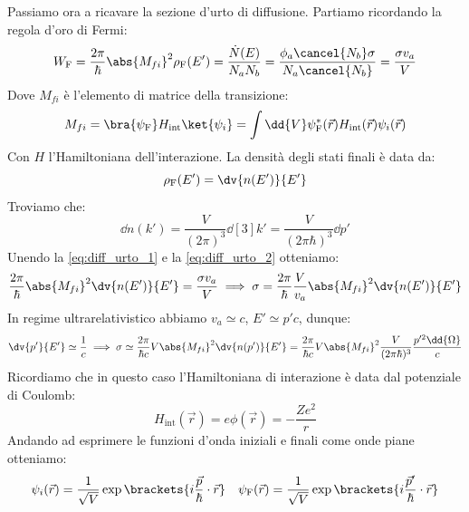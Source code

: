 Passiamo ora a ricavare la sezione d'urto di diffusione. Partiamo ricordando la regola d'oro di Fermi:
\begin{equation} \label{eq:diff_urto_1}
  W_{\text{F}} = \dfrac{2 \pi}{\hbar} \abs{M_{fi}}^2 \rho_{\text{F}}(E') = \dfrac{\dot{N}(E)}{N_a N_b} = \dfrac{\phi_a \cancel{N_b} \sigma}{N_a \cancel{N_b}} = \dfrac{\sigma v_a}{V}
\end{equation}
Dove $M_{fi}$ è l'elemento di matrice della transizione:
\begin{equation}
  M_{fi} = \bra{\psi_{\text{F}}}H_{\text{int}}\ket{\psi_i} = \int \dd{V} \psi_{\text{F}}^*(\vec{r}) H_{\text{int}}(\vec{r}) \psi_i(\vec{r})
\end{equation}
Con $H$ l'Hamiltoniana dell'interazione. La densità degli stati finali è data da:
\begin{equation} \label{eq:diff_urto_2}
  \rho_{\text{F}}(E') = \dv{n(E')}{E'}
\end{equation}
Troviamo che:
\begin{equation}
  \dd{n(k')} = \dfrac{V}{(2 \pi)^3} \dd[3]{k'} = \dfrac{V}{(2 \pi \hbar)^3}\dd{p'}
\end{equation}
Unendo la \eqref{eq:diff_urto_1} e la \eqref{eq:diff_urto_2} otteniamo:
\begin{equation}
  \dfrac{2 \pi}{\hbar} \abs{M_{fi}}^2 \dv{n(E')}{E'} = \dfrac{\sigma v_a}{V} \implies \sigma = \dfrac{2 \pi}{\hbar} \dfrac{V}{v_a} \abs{M_{fi}}^2 \dv{n(E')}{E'}
\end{equation}
In regime ultrarelativistico abbiamo $v_a \simeq c$, $E' \simeq p'c$, dunque:
\begin{equation}
  \dv{p'}{E'} \simeq \dfrac{1}{c} \implies \sigma \simeq \dfrac{2 \pi}{\hbar c} V \abs{M_{fi}}^2 \dv{n(p')}{E'} = \dfrac{2 \pi}{\hbar c} V \abs{M_{fi}}^2 \dfrac{V}{(2 \pi \hbar)^3} \dfrac{p'^2 \dd{\Omega}}{c}
\end{equation}
Ricordiamo che in questo caso l'Hamiltoniana di interazione è data dal potenziale di Coulomb:
\begin{equation}
  H_{\text{int}}(\vec{r}) = e\phi(\vec{r}) = -\dfrac{Z e^2}{r}
\end{equation}
Andando ad esprimere le funzioni d'onda iniziali e finali come onde piane otteniamo:
\begin{equation}
  \psi_i(\vec{r}) = \dfrac{1}{\sqrt{V}} \exp\brackets{i \dfrac{\vec{p}}{\hbar} \cdot \vec{r}} \quad \psi_{\text{F}}(\vec{r}) = \dfrac{1}{\sqrt{V}} \exp\brackets{i \dfrac{\vec{p}'}{\hbar} \cdot \vec{r}}
\end{equation}
